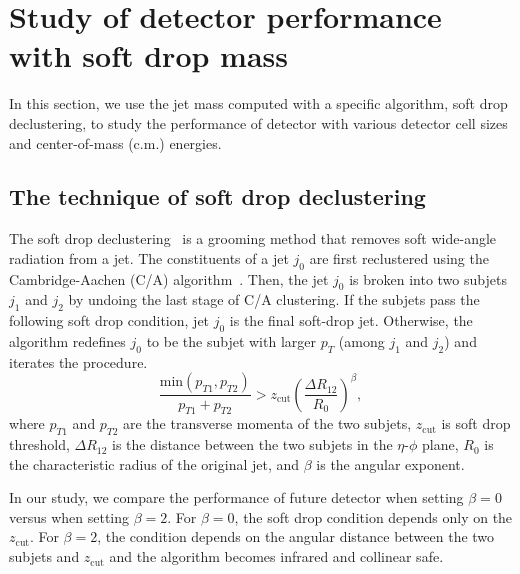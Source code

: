\section{Study of detector performance with soft drop mass}
In this section, we use the jet mass computed with a specific algorithm, soft 
drop declustering, to study the performance of detector with various detector 
cell sizes and center-of-mass (c.m.) energies. 
\subsection{The technique of soft drop declustering}
The soft drop declustering~\cite{Larkoski:2014wba} is a grooming method 
that removes soft wide-angle radiation from a jet. The constituents of a jet 
$j_0$ are first reclustered using the Cambridge-Aachen
 (C/A) algorithm~\cite{Dokshitzer:1997in,Wobisch:1998wt}. Then, the jet $j_0$ 
is broken into two subjets $j_1$ and $j_2$ by undoing the last stage of C/A 
clustering.
If the subjets pass the following soft drop condition, jet $j_0$ is the final 
soft-drop jet. Otherwise, the algorithm redefines $j_0$ to be the subjet with 
larger $p_T$ (among $j_1$ and $j_2$) and iterates the procedure.
\begin{equation} \label{eq:soft-drop}
\frac{\mathrm{min}(p_{T1},p_{T2})}{p_{T1}+p_{T2}}>z_\mathrm{cut}(\frac{\Delta R_{12}}{R_{0}})^{\beta},
\end{equation}
where $p_{T1}$ and $p_{T2}$ are the transverse momenta of the two subjets, 
$z_\mathrm{cut}$ is soft drop threshold, 
$\Delta R_{12}$ is the distance between the two subjets in the $\eta$-$\phi$ 
plane, $R_0$ is the characteristic radius of the original jet, and $\beta$ is 
the angular exponent.

In our study, we compare the performance of future detector when setting 
$\beta=0$ versus when setting $\beta=2$. For $\beta=0$, the soft drop condition 
depends only on the $z_\mathrm{cut}$. For $\beta=2$, the condition depends on 
the angular distance between the two subjets and $z_\mathrm{cut}$ and the 
algorithm becomes infrared and collinear safe. 

